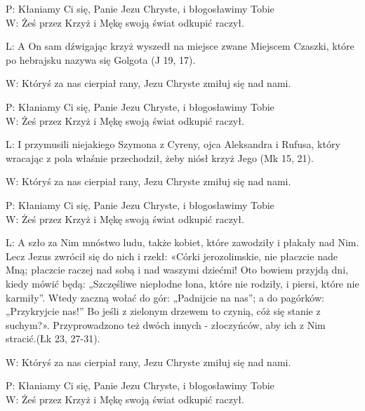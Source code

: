 ﻿\documentclass[9pt,twoside]{extarticle}
\begin{document}
{\hnr{}}


{\hnr P:} Kłaniamy Ci się, Panie Jezu Chryste, i błogosławimy Tobie\\
{\hnr W:} Żeś przez Krzyż i Mękę swoją świat odkupić raczył.


{\hnr L:} A On sam dźwigając krzyż wyszedł na miejsce zwane Miejscem Czaszki, które po hebrajsku nazywa się Golgota (J 19, 17).


{\hnr W:} Któryś za nas cierpiał rany, Jezu Chryste zmiłuj się nad nami.


{\hnr{}}


{\hnr P:} Kłaniamy Ci się, Panie Jezu Chryste, i błogosławimy Tobie\\
{\hnr W:} Żeś przez Krzyż i Mękę swoją świat odkupić raczył.


{\hnr L:} I przymusili niejakiego Szymona z Cyreny, ojca Aleksandra i Rufusa, który wracając z pola właśnie przechodził, żeby niósł krzyż Jego (Mk 15, 21).


{\hnr W:} Któryś za nas cierpiał rany, Jezu Chryste zmiłuj się nad nami.


{\hnr{}}


{\hnr P:} Kłaniamy Ci się, Panie Jezu Chryste, i błogosławimy Tobie\\
{\hnr W:} Żeś przez Krzyż i Mękę swoją świat odkupić raczył.


{\hnr L:} A szło za Nim mnóstwo ludu, także kobiet, które zawodziły i płakały nad Nim. Lecz Jezus zwrócił się do nich i rzekł: «Córki jerozolimskie, nie płaczcie nade Mną; płaczcie raczej nad sobą i nad waszymi dziećmi! Oto bowiem przyjdą dni, kiedy mówić będą: „Szczęśliwe niepłodne łona, które nie rodziły, i piersi, które nie karmiły”. Wtedy zaczną wołać do gór: „Padnijcie na nas”; a do pagórków: „Przykryjcie nas!” Bo jeśli z zielonym drzewem to czynią, cóż się stanie z suchym?». Przyprowadzono też dwóch innych - złoczyńców, aby ich z Nim stracić.(Łk 23, 27-31).


{\hnr W:} Któryś za nas cierpiał rany, Jezu Chryste zmiłuj się nad nami.


{\hnr{}}


{\hnr P:} Kłaniamy Ci się, Panie Jezu Chryste, i błogosławimy Tobie\\
{\hnr W:} Żeś przez Krzyż i Mękę swoją świat odkupić raczył.
\end{document}
